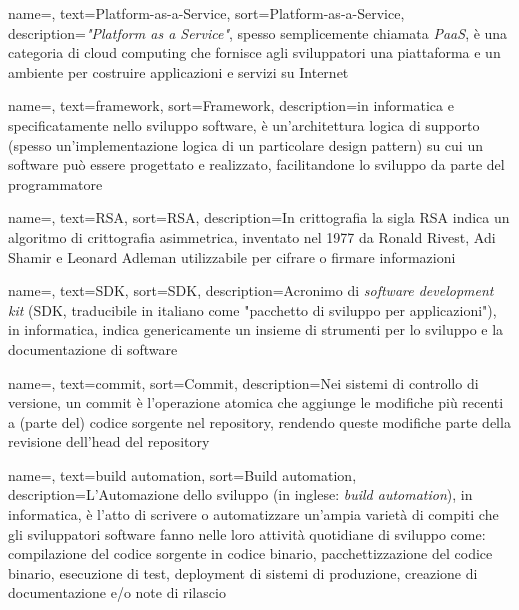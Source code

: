 {
    name=,
    text=Platform-as-a-Service,
    sort=Platform-as-a-Service,
    description={\emph{"Platform as a Service"}, spesso semplicemente chiamata \emph{PaaS}, è una categoria di cloud computing che fornisce agli sviluppatori una piattaforma e un ambiente per costruire applicazioni e servizi su Internet}
}

{
    name=,
    text=framework,
    sort=Framework,
    description={in informatica e specificatamente nello sviluppo software, è un'architettura logica di supporto (spesso un'implementazione logica di un particolare design pattern) su cui un software può essere progettato e realizzato, facilitandone lo sviluppo da parte del programmatore}
}

{
    name=,
    text=RSA,
    sort=RSA,
    description={In crittografia la sigla RSA indica un algoritmo di crittografia asimmetrica, inventato nel 1977 da Ronald Rivest, Adi Shamir e Leonard Adleman utilizzabile per cifrare o firmare informazioni}
}

{
    name=,
    text=SDK,
    sort=SDK,
    description={Acronimo di \emph{software development kit} (SDK, traducibile in italiano come "pacchetto di sviluppo per applicazioni"), in informatica, indica genericamente un insieme di strumenti per lo sviluppo e la documentazione di software}
}

{
    name=,
    text=commit,
    sort=Commit,
    description={Nei sistemi di controllo di versione, un commit è l'operazione atomica che aggiunge le modifiche più recenti a (parte del) codice sorgente nel repository, rendendo queste modifiche parte della revisione dell'head del repository}
}

{
    name=,
    text=build automation,
    sort=Build automation,
    description={L'Automazione dello sviluppo (in inglese: \emph{build automation}), in informatica, è l'atto di scrivere o automatizzare un'ampia varietà di compiti che gli sviluppatori software fanno nelle loro attività quotidiane di sviluppo come: compilazione del codice sorgente in codice binario, pacchettizzazione del codice binario, esecuzione di test, deployment di sistemi di produzione, creazione di documentazione e/o note di rilascio}
}

